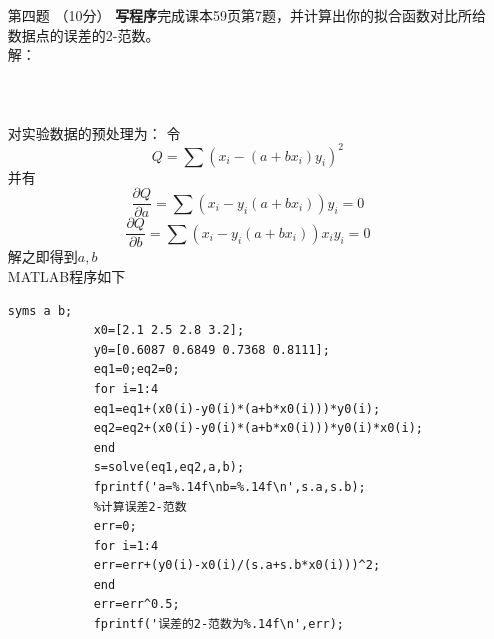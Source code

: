 \documentclass[12pt,a4paper,utf8]{ctexart}
\begin{document}
	\begin{enumerate}
		
		\item[第四题]（10分） \textbf{写程序}完成课本59页第7题，并计算出你的拟合函数对比所给数据点的误差的2-范数。\\
		解：\\
			\\
			\\
			\\
			对实验数据的预处理为：
			令$$
			Q=\sum (x_{i}-(a+bx_{i})y_{i})^{2}
			$$并有$$
			\frac{\partial Q}{\partial a}=\sum (x_{i}-y_{i}(a+bx_{i}))y_{i}=0
			$$ $$
			\frac{\partial Q}{\partial b}=\sum (x_{i}-y_{i}(a+bx_{i}))x_{i}y_{i}=0
			$$解之即得到$a,b$\\
			MATLAB程序如下
		\begin{lstlisting}[breaklines,frame=single]
			syms a b;
			x0=[2.1 2.5 2.8 3.2];
			y0=[0.6087 0.6849 0.7368 0.8111];
			eq1=0;eq2=0;
			for i=1:4
			eq1=eq1+(x0(i)-y0(i)*(a+b*x0(i)))*y0(i);
			eq2=eq2+(x0(i)-y0(i)*(a+b*x0(i)))*y0(i)*x0(i);
			end
			s=solve(eq1,eq2,a,b);
			fprintf('a=%.14f\nb=%.14f\n',s.a,s.b);
			%计算误差2-范数
			err=0;
			for i=1:4
			err=err+(y0(i)-x0(i)/(s.a+s.b*x0(i)))^2;
			end
			err=err^0.5;
			fprintf('误差的2-范数为%.14f\n',err);
		\end{lstlisting}
	\end{enumerate}
\end{document}
